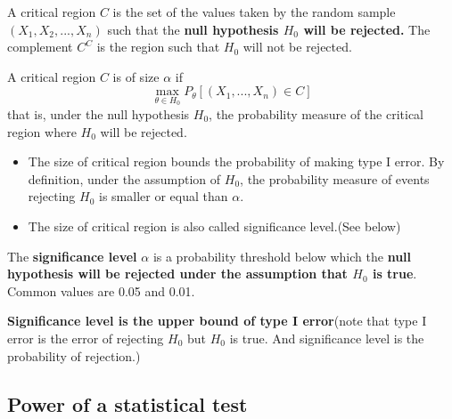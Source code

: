 \begin{refsection}
\begin{definition}\cite[245]{hoggintroduction}
	A critical region $C$ is the set of the values taken by the random sample $(X_1,X_2,...,X_n)$ such that the \textbf{null hypothesis $H_0$ will be rejected.} The complement $C^C$ is the region such that $H_0$ will not be rejected.	
\end{definition}

\begin{definition}
A critical region $C$ is of size $\alpha$ if
$$\max_{\theta \in H_0} P_\theta[(X_1,...,X_n)\in C]$$
that is, under the null hypothesis $H_0$, the probability measure of the critical region where $H_0$ will be rejected.
\end{definition}

\begin{remark}\hfill
	\begin{itemize}
		\item The size of critical region bounds the probability of making type I error. By definition, under the assumption of $H_0$, the probability measure of events rejecting $H_0$ is smaller or equal than $\alpha$. 
		\item The size of critical region is also called significance level.(See below)
	\end{itemize}
\end{remark}


\begin{definition}
The \textbf{significance level} $\alpha$ is a probability threshold below which the \textbf{null hypothesis will be rejected under the assumption that $H_0$ is true}. 
Common values are 0.05 and 0.01.	
\end{definition}

\begin{remark}
\textbf{Significance level is the upper bound of type I error}(note that type I error is the error of rejecting $H_0$ but $H_0$ is true. And significance level is the probability of rejection.)
\end{remark}



\subsection{Power of a statistical test}






\end{refsection}
